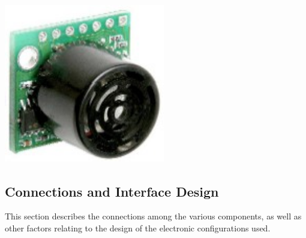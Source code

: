  \begin{center}
    \includegraphics[width=70mm, height= 70mm]{imageSources/sonar.png}
  \end{center}
  \label{sonar}


\subsection{Connections and Interface Design}
This section describes the connections among the various components, as well as other factors relating to the design of the electronic configurations used.  

